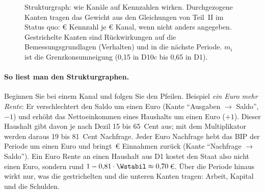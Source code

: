 \begin{figure}[p]
{}
\caption{Strukturgraph: wie Kanäle auf Kennzahlen wirken. Durchgezogene Kanten tragen das
Gewicht aus den Gleichungen von Teil~II im Status quo: \euro{} Kennzahl je \euro{} Kanal,
wenn nicht anders angegeben. Gestrichelte Kanten sind Rückwirkungen auf die
Bemessungsgrundlagen (Verhalten) und in die nächste Periode. $m_i$ ist die
Grenzkonsumneigung (0,15 in D10c bis 0,65 in D1).}
\label{fig:struktur}
\end{figure}

\paragraph{So liest man den Strukturgraphen.} Beginnen Sie bei einem Kanal und folgen Sie
den Pfeilen. Beispiel \emph{ein Euro mehr Rente}: Er verschlechtert den Saldo um einen Euro
(Kante \enquote{Ausgaben $\to$ Saldo}, $-1$) und erhöht das Nettoeinkommen eines Haushalts um
einen Euro ($+1$). Dieser Haushalt gibt davon je nach Dezil 15 bis 65~Cent aus; mit dem
Multiplikator werden daraus 19 bis 81~Cent Nachfrage. Jeder Euro Nachfrage hebt das BIP der
Periode um einen Euro und bringt \Wstabil\,\euro{} Einnahmen zurück (Kante
\enquote{Nachfrage $\to$ Saldo}). Ein Euro Rente an einen Haushalt aus D1 kostet den Staat
also nicht einen Euro, sondern rund $1-0{,}81\cdot\Wstabil\approx0{,}70$\,\euro. Über die
Periode hinaus wirkt nur, was die gestrichelten und die unteren Kanten tragen: Arbeit,
Kapital und die Schulden.

